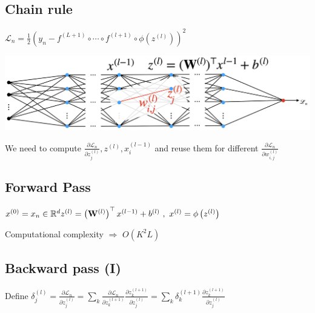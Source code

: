 
\subsection*{Chain rule}
$
\mathscr{L}_{n}=\frac{1}{2}\left(y_{n}-f^{(L+1)} \circ \cdots \circ f^{(l+1)} \circ \phi\left(z^{(l)}\right)\right)^{2}
$

\includegraphics*[width=\columnwidth]{figures/nn4.png}


We need to compute $\frac{\partial \mathscr{L}_{n}}{\partial z_{j}^{(l)}}, z^{(l)}, x_{i}^{(l-1)}$ and reuse them for different $\frac{\partial \mathscr{L}_{n}}{\partial w_{i, j}^{(l)}}$

\subsection*{Forward Pass}
$
x^{(0)}=x_{n} \in \mathbb{R}^{d} \\
z^{(l)}=\left(\mathbf{W}^{(l)}\right)^{\top} x^{(l-1)}+b^{(l)} \ , \
x^{(l)}=\phi\left(z^{(l)}\right)
$

Computational complexity $\Rightarrow$ $O\left(K^{2} L\right)$

\subsection*{Backward pass (I)}
Define $\delta_{j}^{(l)}=\frac{\partial \mathscr{L}_{n}}{\partial z_{j}^{(l)}}=\sum_{k} \frac{\partial \mathscr{L}_{n}}{\partial z_{k}^{(l+1)}} \frac{\partial z_{k}^{(l+1)}}{\partial z_{j}^{(l)}}=\sum_{k} \delta_{k}^{(l+1)} \frac{\partial z_{k}^{(l+1)}}{\partial z_{j}^{(l)}}
$

